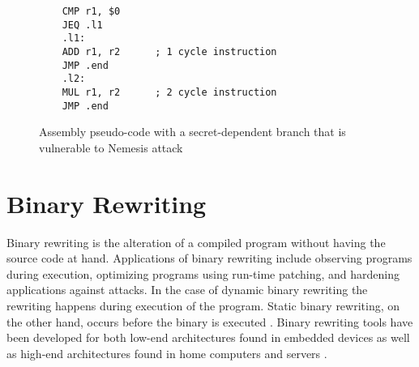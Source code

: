 \lstset{language=[x64]Assembler, numbers=left, stepnumber=1, frame=single}
\begin{figure}

    \begin{lstlisting}
	CMP r1, $0
	JEQ .l1
	.l1: 
	ADD r1, r2 		; 1 cycle instruction
	JMP .end
	.l2: 
	MUL r1, r2 		; 2 cycle instruction
	JMP .end
	\end{lstlisting}
	\caption{Assembly pseudo-code with a secret-dependent branch that is vulnerable to Nemesis attack}
	\label{fig:pseudo-assembly}
\end{figure}


\section{Binary Rewriting}
\label{sec:rewriting}
Binary rewriting is the alteration of a compiled program without having the source code at hand. 
Applications of binary rewriting include observing programs during execution, optimizing programs using run-time patching, and 
hardening applications against attacks. In the case of dynamic binary rewriting the rewriting happens during execution of the program. 
Static binary rewriting, on the other hand, occurs before the binary is executed \cite{rewriting-survey}. 
Binary rewriting tools have been developed for both low-end architectures found in embedded devices \cite{microsbs} as well as high-end architectures found in home computers and servers 
\cite{ instruction-punning, Dinesh2020RetroWriteSI, E9Patch}. 
